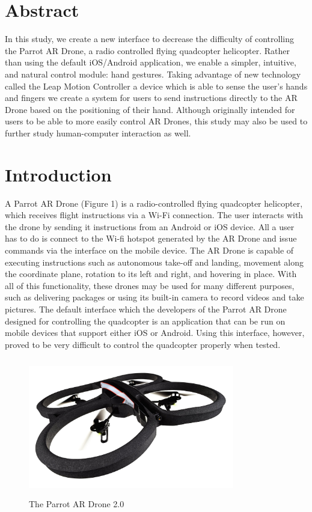 \documentclass[letterpaper,english, 12pt]{article}
\begin{document}
\newpage

\section*{Abstract}
	In this study, we create a new interface to decrease the difficulty of controlling the Parrot AR Drone, a radio controlled flying quadcopter helicopter. Rather than using the default iOS/Android application, we enable a simpler, intuitive, and natural control module: hand gestures. Taking advantage of new technology called the Leap Motion Controller \textemdash a device which is able to sense the user's hands and fingers \textemdash we create a system for users to send instructions directly to the AR Drone based on the positioning of their hand. Although originally intended for users to be able to more easily control AR Drones, this study may also be used to further study human-computer interaction as well.


\section*{Introduction}

A Parrot AR Drone (Figure 1) is a radio-controlled flying quadcopter helicopter, which receives flight instructions via a Wi-Fi connection. The user interacts with the drone by sending it instructions from an Android or iOS device. All a user has to do is connect to the Wi-fi hotspot generated by the AR Drone and issue commands via the interface on the mobile device. The AR Drone is capable of executing instructions such as autonomous take-off and landing, movement along the coordinate plane, rotation to its left and right, and hovering in place. With all of this functionality, these drones may be used for many different purposes, such as delivering packages or using its built-in camera to record videos and take pictures. The default interface which the developers of the Parrot AR Drone designed for controlling the quadcopter is an application that can be run on mobile devices that support either iOS or Android. Using this interface, however, proved to be very difficult to control the quadcopter properly when tested.
        
\begin{figure}[t]
	\centering
	\includegraphics[height=6cm,width=90mm]{pics/drone.jpg} 
	\caption{The Parrot AR Drone 2.0}
\end{figure}
	
\end{document}
